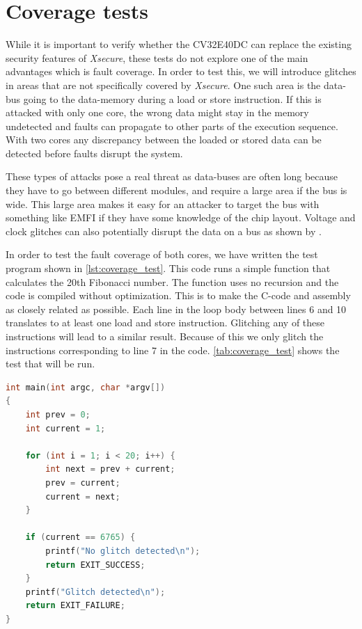 \section{Coverage tests}
\label{sec:coverage_test}

While it is important to verify whether the CV32E40DC can replace the existing security features of \textit{Xsecure}, these tests do not explore one of the main advantages which is fault coverage. In order to test this, we will introduce glitches in areas that are not specifically covered by \textit{Xsecure}. One such area is the data-bus going to the data-memory during a load or store instruction. If this is attacked with only one core, the wrong data might stay in the memory undetected and faults can propagate to other parts of the execution sequence. With two cores any discrepancy between the loaded or stored data can be detected before faults disrupt the system. 

These types of attacks pose a real threat as data-buses are often long because they have to go between different modules, and require a large area if the bus is wide. This large area makes it easy for an attacker to target the bus with something like EMFI\cite{emfi_injection} if they have some knowledge of the chip layout. Voltage and clock glitches can also potentially disrupt the data on a bus as shown by \cite{bus_glitch}. 

In order to test the fault coverage of both cores, we have written the test program shown in \autoref{lst:coverage_test}. This code runs a simple function that calculates the 20th Fibonacci number. The function uses no recursion and the code is compiled without optimization. This is to make the C-code and assembly as closely related as possible. Each line in the loop body between lines 6 and 10 translates to at least one load and store instruction. Glitching any of these instructions will lead to a similar result. Because of this we only glitch the instructions corresponding to line 7 in the code. \autoref{tab:coverage_test} shows the test that will be run. 


\begin{lstlisting}[caption={Test code for simulating glitch in address-bus.}, label=lst:coverage_test, language=C++]
int main(int argc, char *argv[])
{
    int prev = 0;
    int current = 1;

    for (int i = 1; i < 20; i++) {
        int next = prev + current;
        prev = current;
        current = next;
    }

    if (current == 6765) {
        printf("No glitch detected\n");
        return EXIT_SUCCESS;
    }
    printf("Glitch detected\n");
    return EXIT_FAILURE;
}
\end{lstlisting}

